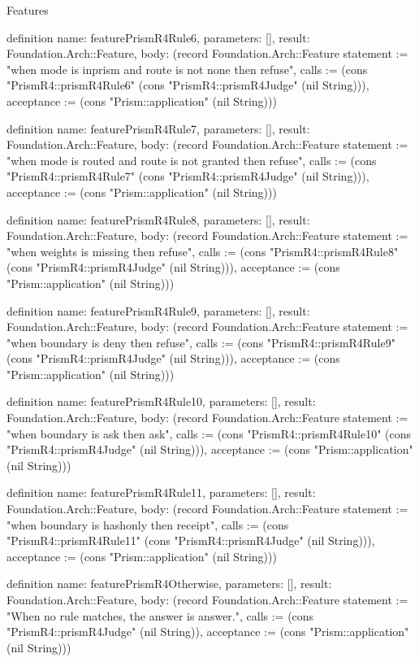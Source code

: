 \begin{lexlean}{Features}
\begin{semanticmodule}
definition{
  name: featurePrismR4Rule6,
  parameters: [],
  result: Foundation.Arch::Feature,
  body: (record Foundation.Arch::Feature {statement := "when mode is inprism and route is not none then refuse", calls := (cons "PrismR4::prismR4Rule6" (cons "PrismR4::prismR4Judge" (nil String))), acceptance := (cons "Prism::application" (nil String))})
}

definition{
  name: featurePrismR4Rule7,
  parameters: [],
  result: Foundation.Arch::Feature,
  body: (record Foundation.Arch::Feature {statement := "when mode is routed and route is not granted then refuse", calls := (cons "PrismR4::prismR4Rule7" (cons "PrismR4::prismR4Judge" (nil String))), acceptance := (cons "Prism::application" (nil String))})
}

definition{
  name: featurePrismR4Rule8,
  parameters: [],
  result: Foundation.Arch::Feature,
  body: (record Foundation.Arch::Feature {statement := "when weights is missing then refuse", calls := (cons "PrismR4::prismR4Rule8" (cons "PrismR4::prismR4Judge" (nil String))), acceptance := (cons "Prism::application" (nil String))})
}

definition{
  name: featurePrismR4Rule9,
  parameters: [],
  result: Foundation.Arch::Feature,
  body: (record Foundation.Arch::Feature {statement := "when boundary is deny then refuse", calls := (cons "PrismR4::prismR4Rule9" (cons "PrismR4::prismR4Judge" (nil String))), acceptance := (cons "Prism::application" (nil String))})
}

definition{
  name: featurePrismR4Rule10,
  parameters: [],
  result: Foundation.Arch::Feature,
  body: (record Foundation.Arch::Feature {statement := "when boundary is ask then ask", calls := (cons "PrismR4::prismR4Rule10" (cons "PrismR4::prismR4Judge" (nil String))), acceptance := (cons "Prism::application" (nil String))})
}

definition{
  name: featurePrismR4Rule11,
  parameters: [],
  result: Foundation.Arch::Feature,
  body: (record Foundation.Arch::Feature {statement := "when boundary is hashonly then receipt", calls := (cons "PrismR4::prismR4Rule11" (cons "PrismR4::prismR4Judge" (nil String))), acceptance := (cons "Prism::application" (nil String))})
}

definition{
  name: featurePrismR4Otherwise,
  parameters: [],
  result: Foundation.Arch::Feature,
  body: (record Foundation.Arch::Feature {statement := "When no rule matches, the answer is answer.", calls := (cons "PrismR4::prismR4Judge" (nil String)), acceptance := (cons "Prism::application" (nil String))})
}


\end{semanticmodule}
\end{lexlean}
